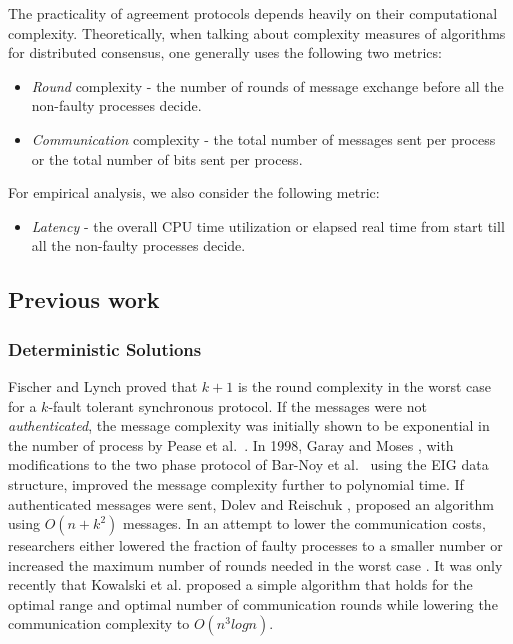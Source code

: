 The practicality of agreement protocols depends heavily on their computational complexity. Theoretically, when talking about complexity measures of algorithms for distributed consensus, one generally uses the following two metrics:
\begin{itemize}
\item \textit{Round} complexity - the number of rounds of message exchange before all the non-faulty processes decide.
\item \textit{Communication} complexity - the total number of messages sent per process or the total number of bits sent per process.
\end{itemize}
For empirical analysis, we also consider the following metric: 
\begin{itemize}
\item \textit{Latency} - the overall CPU time utilization or elapsed real time from start till all the non-faulty processes decide.
\end{itemize}

\subsection{Previous work}

\subsubsection{Deterministic Solutions}
Fischer and Lynch \cite{Fischer81alower} proved that $k + 1$ is the round
complexity in the worst case for a $k$-fault tolerant synchronous protocol. If
the messages were not \textit{authenticated}, the message complexity was
initially shown to be exponential in the number of process by Pease et
al.~\cite{PeaseSL80}. In 1998, Garay and Moses \cite{GarayM98}, with
modifications to the two phase protocol of Bar-Noy et al.~\cite{BDDS87} using
the EIG data structure, improved the message complexity further to polynomial
time. If authenticated messages were sent, Dolev and Reischuk \cite{DolevR85},
proposed an algorithm using $O(n + k^2)$ messages. In an attempt to lower the
communication costs, researchers either lowered the fraction of faulty
processes to a smaller number \cite{DRS90} or increased the maximum number of
rounds needed in the worst case \cite{TPS87}. It was only recently that
Kowalski et al. \cite{KM13} proposed a simple algorithm that holds for the
optimal range and optimal number of communication rounds while lowering the
communication complexity to $O(n^{3}logn)$.

